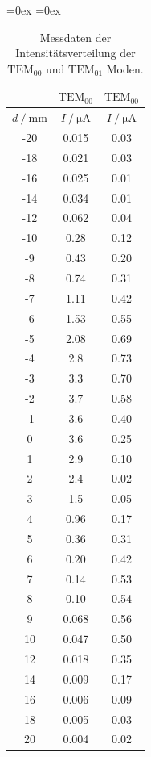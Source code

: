 \begin{table}
  \centering
  \aboverulesep=0ex %
  \belowrulesep=0ex %
  \caption{Messdaten der Intensitätsverteilung der $\text{TEM}_{00}$ und $\text{TEM}_{01}$ Moden.}
  \label{tab:TEM}
  \begin{tabular}{S[table-format = 2.0] | S[table-format = 1.3]  S[table-format = 1.2]}
    {} & {$\text{TEM}_{00}$} & {$\text{TEM}_{00}$} \\
    \midrule
    \rule{0pt}{1.1EM}
    {$d \mathbin{/} \unit{\milli\metre}$} & {$I \mathbin{/} \unit{\micro\ampere}$} & {$I \mathbin{/} \unit{\micro\ampere}$} \\
    \midrule
    \rule{0pt}{1.1EM}
    -20 & 0.015 & 0.03 \\
    -18 & 0.021 & 0.03 \\
    -16 & 0.025 & 0.01 \\
    -14 & 0.034 & 0.01 \\
    -12 & 0.062 & 0.04 \\
    -10 & 0.28  & 0.12 \\
     -9 & 0.43  & 0.20 \\
     -8 & 0.74  & 0.31 \\
     -7 & 1.11  & 0.42 \\
     -6 & 1.53  & 0.55 \\
     -5 & 2.08  & 0.69 \\
     -4 & 2.8   & 0.73 \\
     -3 & 3.3   & 0.70 \\
     -2 & 3.7   & 0.58 \\
     -1 & 3.6   & 0.40 \\
      0 & 3.6   & 0.25 \\
      1 & 2.9   & 0.10 \\
      2 & 2.4   & 0.02 \\
      3 & 1.5   & 0.05 \\
      4 & 0.96  & 0.17 \\
      5 & 0.36  & 0.31 \\
      6 & 0.20  & 0.42 \\
      7 & 0.14  & 0.53 \\
      8 & 0.10  & 0.54 \\
      9 & 0.068 & 0.56 \\
     10 & 0.047 & 0.50 \\
     12 & 0.018 & 0.35 \\
     14 & 0.009 & 0.17 \\
     16 & 0.006 & 0.09 \\
     18 & 0.005 & 0.03 \\
     20 & 0.004 & 0.02 \\
  \end{tabular}
\end{table}

